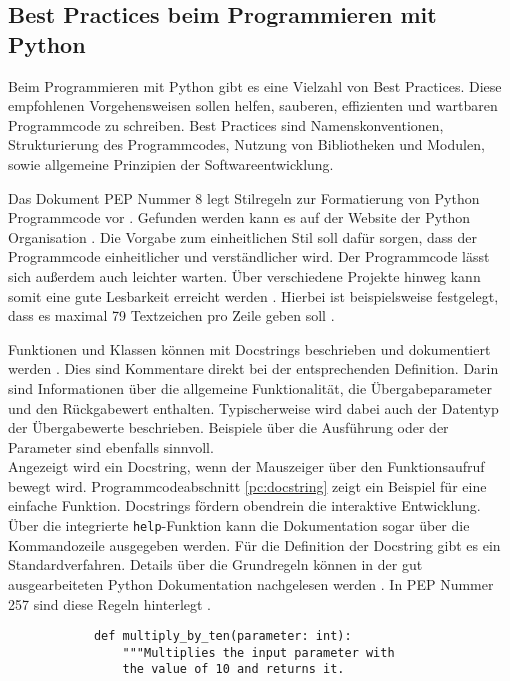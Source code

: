 \subsection{Best Practices beim Programmieren mit Python}
Beim Programmieren mit Python gibt es eine Vielzahl von Best Practices.
Diese empfohlenen Vorgehensweisen sollen helfen, sauberen, effizienten und wartbaren Programmcode zu schreiben.
Best Practices sind Namenskonventionen, Strukturierung des Programmcodes, Nutzung von Bibliotheken und Modulen, sowie allgemeine Prinzipien der Softwareentwicklung. \\

\begin{description}[style=nextline]
	\item[\acs{PEP} 8 Style Guide] Das Dokument \ac{PEP} Nummer 8 legt Stilregeln zur Formatierung von Python Programmcode vor \cite{Slatkin2015-xn}.
	Gefunden werden kann es auf der Website der Python Organisation \cite{inet:pep8}.
	Die Vorgabe zum einheitlichen Stil soll dafür sorgen, dass der Programmcode einheitlicher und verständlicher wird.
	Der Programmcode lässt sich außerdem auch leichter warten.
	Über verschiedene Projekte hinweg kann somit eine gute Lesbarkeit erreicht werden \cite{Slatkin2015-xn}.
	Hierbei ist beispielsweise festgelegt, dass es maximal 79 Textzeichen pro Zeile geben soll \cite{inet:pep8}.
	
	\item[Docstrings] Funktionen und Klassen können mit Docstrings beschrieben und dokumentiert werden \cite{Klein2021-ko}.
	Dies sind Kommentare direkt bei der entsprechenden Definition.
	Darin sind Informationen über die allgemeine Funktionalität, die Übergabeparameter und den Rückgabewert enthalten.
	Typischerweise wird dabei auch der Datentyp der Übergabewerte beschrieben.
	Beispiele über die Ausführung oder der Parameter sind ebenfalls sinnvoll. \\
	
	Angezeigt wird ein Docstring, wenn der Mauszeiger über den Funktionsaufruf bewegt wird.
	Programmcodeabschnitt \ref{pc:docstring} zeigt ein Beispiel für eine einfache Funktion.
	Docstrings fördern obendrein die interaktive Entwicklung.
	Über die integrierte \verb*|help|-Funktion kann die Dokumentation sogar über die Kommandozeile ausgegeben werden.
	Für die Definition der Docstring gibt es ein Standardverfahren.
	Details über die Grundregeln können in der gut ausgearbeiteten Python Dokumentation nachgelesen werden \cite{Slatkin2015-xn}.
	In \ac{PEP} Nummer 257 sind diese Regeln hinterlegt \cite{inet:pep257}.
	\begin{listing}[H]
		\begin{verbatim}
			def multiply_by_ten(parameter: int):
				"""Multiplies the input parameter with 
				the value of 10 and returns it.
				

\end{verbatim}
\end{listing}
\end{description}
